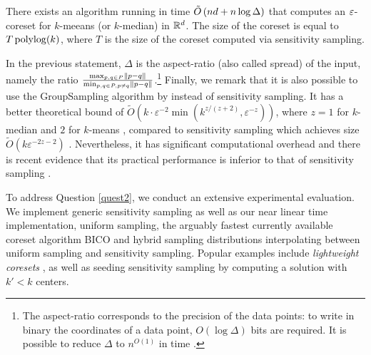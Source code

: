 \begin{theorem}\label{thm:main}
There exists an algorithm running in time $\tilde O\left( nd + n \log \Delta\right)$  that computes an $\varepsilon$-coreset for $k$-meeans (or $k$-median) in $\mathbb{R}^d$. The size of the coreset is equal to $T \operatorname{polylog}(k)$, where $T$ is the size of the coreset computed via sensitivity sampling.
\end{theorem}
In the previous statement, $\Delta$ is the aspect-ratio (also called spread) of the input, namely the ratio $\frac{\max_{p, q \in P} \left\| p-q\right\|}{\min_{p, q \in P, p \neq q} \left\| p-q\right\|}$.\footnote{The aspect-ratio corresponds to the precision of the data points: to write in binary the coordinates of a data point, $O(\log \Delta)$ bits are required. It is possible to reduce $\Delta$ to $n^{O(1)}$ in time .}
Finally, we remark that it is also possible to use the GroupSampling algorithm by \cite{CSS21} instead of sensitivity sampling. It has a better theoretical bound of  $\tilde{O}(k\cdot \varepsilon^{-2} \min(k^{z/(z+2)},\varepsilon^{-z}))$, where $z=1$ for $k$-median and $2$ for $k$-means \cite{CLSSS22}, compared to sensitivity sampling which achieves size $\tilde{O}(k\varepsilon^{-2z-2})$ \cite{HuangV20}. Nevertheless, it has significant computational overhead and there is recent evidence that its practical performance is inferior to that of sensitivity sampling \cite{chrisESA}. 

%


To address Question \ref{quest2}, we conduct an extensive experimental evaluation.
We implement generic sensitivity sampling as well as our near linear time implementation, uniform sampling, the arguably fastest currently available coreset algorithm BICO \cite{bico} and hybrid sampling distributions interpolating between uniform sampling and sensitivity sampling. Popular examples include \emph{lightweight coresets} \cite{bachem2018scalable}, as well as seeding sensitivity sampling by computing a solution with $k'<k$ centers.

